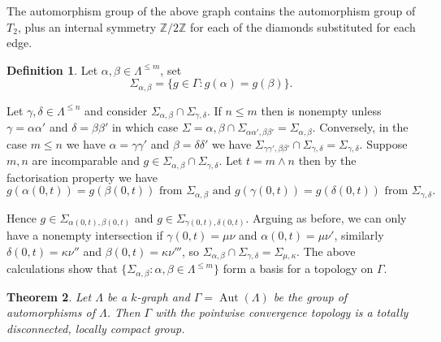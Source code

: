 \documentclass[12pt]{amsart}
\newtheorem{thm}{Theorem}[section]
\theoremstyle{definition}
\newtheorem{dfn}[thm]{Definition}
\theoremstyle{remark}
\numberwithin{equation}{section}
\newcommand{\Aut}{\operatorname{Aut}}
\begin{document}
\noindent
The automorphism group of the above graph contains the automorphism group of $T_2$, plus
an internal symmetry $\mathbb{Z} / 2 \mathbb{Z}$ for each of the diamonds substituted for each edge.

\begin{dfn}
Let $\alpha, \beta \in \Lambda^{\le m}$,  set
\[
\Sigma_{\alpha,\beta} = \{ g \in \Gamma : g ( \alpha ) = g ( \beta ) \} .
\]
\end{dfn}

\noindent
Let $\gamma,\delta \in \Lambda^{\le n}$ and consider $\Sigma_{\alpha,\beta} \cap \Sigma_{\gamma,\delta}$. If $n \le m$ then is nonempty unless 
$\gamma = \alpha \alpha'$ and $\delta = \beta \beta'$ in which case $\Sigma={\alpha,\beta} \cap \Sigma_{\alpha\alpha',\beta\beta'} = \Sigma_{\alpha,\beta}$. Conversely, in the case $m \le n$ we have $\alpha = \gamma \gamma'$ and $\beta = \delta  \delta'$ we have $\Sigma_{\gamma \gamma',\beta \beta'} \cap \Sigma_{\gamma ,\delta} = \Sigma_{\gamma,\delta}$. Suppose $m,n$ are incomparable and $g \in \Sigma_{\alpha,\beta} \cap \Sigma_{\gamma,\delta}$. Let $t = m \wedge n$ then by the factorisation property we have
\[
g ( \alpha (0,t) ) = g ( \beta (0,t) ) \text{ from } \Sigma_{\alpha,\beta} \text{ and } 
g ( \gamma (0,t) ) = g ( \delta (0,t) ) \text{ from } \Sigma_{\gamma,\delta} .
\]

\noindent
Hence $g \in \Sigma_{\alpha(0,t),\beta(0,t)}$ and $g \in \Sigma_{\gamma(0,t),\delta(0,t)}$.
Arguing as before, we can only have a nonempty intersection if $\gamma (0,t)  = \mu \nu$ and $\alpha (0,t) = \mu \nu'$, similarly $\delta (0,t)  = \kappa \nu''$ and $\beta (0,t) = \kappa \nu'''$, so  $\Sigma_{\alpha,\beta} \cap \Sigma_{\gamma,\delta} = \Sigma_{\mu,\kappa}$. The above calculations show that $\{ \Sigma_{\alpha,\beta} : \alpha ,\beta \in \Lambda^{\le m}  \}$ form a basis for a topology on $\Gamma$.


\begin{thm}
Let $\Lambda$ be a $k$-graph and $\Gamma = \Aut ( \Lambda )$ be the group of automorphisms of $\Lambda$. Then $\Gamma$ with the pointwise convergence topology is a totally disconnected, locally compact group.
\end{thm}
\end{document}
